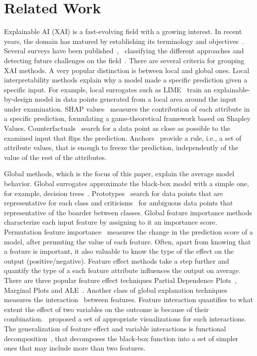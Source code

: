 \documentclass[wcp]{jmlr}
\begin{document}
\section{Related Work}
\label{sec:2-related}

Explainable AI (XAI) is a fast-evolving field with a growing interest. In recent years, the domain has matured by establishing its terminology and objectives~\citep{Hoffman2018}. Several surveys have been published~\citep{BarredoArrieta2020},~\citep{Adadi2018} classifying the different approaches and detecting future challenges on the field~\citep{Molnar2020}. There are several criteria for grouping XAI methods. A very popular distinction is between local and global ones. Local interpretability methods explain why a model made a specific prediction given a specific input. For example, local surrogates such as LIME~\citep{Ribeiro2016} train an explainable-by-design model in data points generated from a local area around the input under examination. SHAP values~\citep{Lundberg2017} measures the contribution of each attribute in a specific prediction, formulating a game-theoretical framework based on Shapley Values. Counterfactuals~\citep{Wachter2017} search for a data point as close as possible to the examined input that flips the prediction. Anchors~\citep{Ribeiro2018} provide a rule, i.e., a set of attribute values, that is enough to freeze the prediction, independently of the value of the rest of the attributes.

Global methods, which is the focus of this paper, explain the average model behavior. Global surrogates approximate the black-box model with a simple one, for example, decision trees~\citep{nanfack2021global}. Prototypes~\citep{Gurumoorthy2019} search for data points that are representative for each class and criticisms~\citep{Kim2016} for ambiguous data points that representative of the boarder between classes. Global feature importance methods characterize each input feature by assigning to it an importance score. Permutation feature importance~\citep{Fisher2019} measures the change in the prediction score of a model, after permuting the value of each feature. Often, apart from knowing that a feature is important, it also valuable to know the type of the effect on the output (positive/negative). Feature effect methods take a step further and quantify the type of a each feature attribute influences the output on average. There are three popular feature effect techniques Partial Dependence Plots~\citep{Friedman2001}, Marginal Plots and ALE~\citep{Apley2020}. Another class of global explanation techniques measures the interaction~\citep{Friedman2008} between features. Feature interaction quantifies to what extent the effect of two variables on the outcome is because of their combination.~\cite{Friedman2008} proposed a set of appropriate visualizations for such interactions. The generalization of feature effect and variable interactions is functional decomposition~\citep{Molnar2021}, that decomposes the black-box function into a set of simpler ones that may include more than two features.
\end{document}
